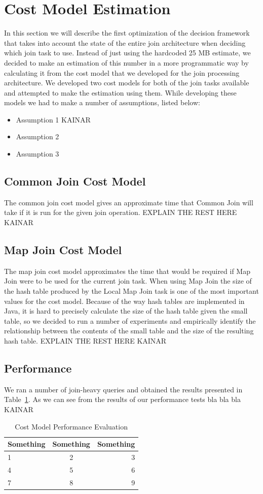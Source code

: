 \documentclass[11 pt ]{article}
\begin{document}
\section{Cost Model Estimation}
In this section we will describe the first optimization of the decision framework that takes into account the state of the entire join architecture when deciding which join task to use. Instead of just using the hardcoded 25 MB estimate, we decided to make an estimation of this number in a more programmatic way by calculating it from the cost model that we developed for the join processing architecture. We developed two cost models for both of the join tasks available and attempted to make the estimation using them. While developing these models we had to make a number of assumptions, listed below:

\begin{itemize}
\item Assumption 1 KAINAR
\item Assumption 2
\item Assumption 3
\end{itemize}
\subsection{Common Join Cost Model}
The common join cost model gives an approximate time that Common Join will take if it is run for the given join operation. 
EXPLAIN THE REST HERE KAINAR

\subsection{Map Join Cost Model}
The map join cost model approximates the time that would be required if Map Join were to be used for the current join task.  When using Map Join the size of the hash table produced by the Local Map Join task is one of the most important values for the cost model. Because of the way hash tables are implemented in Java, it is hard to precisely calculate the size of the hash table given the small table, so we decided to run a number of experiments and empirically identify the relationship between the contents of the small table and the size of the resulting hash table.
EXPLAIN THE REST HERE KAINAR
\subsection{Performance}
We ran a number of join-heavy queries and obtained the results presented in Table~\ref{tab:cost-table}. As we can see from the results of our performance tests bla bla bla KAINAR
\begin{table}
\centering
\begin{tabular}{ | l | c | r |}
  \hline                        
  Something & Something & Something \\
  \hline
  1 & 2 & 3 \\
    \hline	
  4 & 5 & 6 \\
    \hline
  7 & 8 & 9 \\
  \hline  
\end{tabular}
\caption{Cost Model Performance Evaluation}
\label{tab:cost-table}
\end{table}
\end{document}

